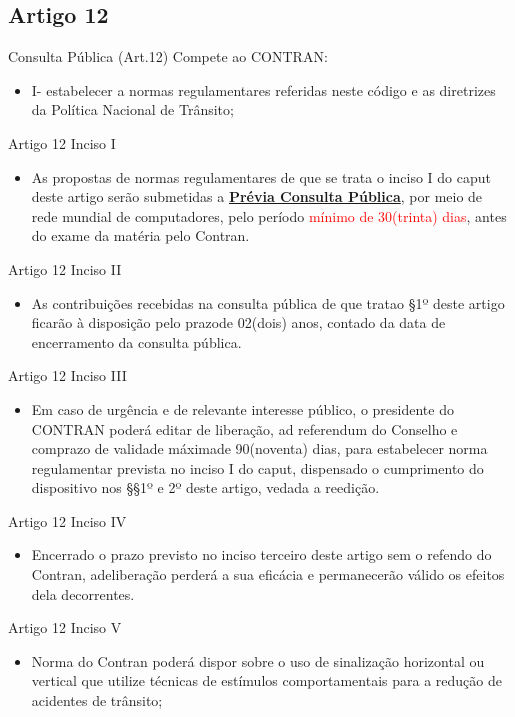 \documentclass{beamer}
\begin{document}
\subsection{Artigo 12}
\begin{frame}{Consulta Pública (Art.12)}
Compete ao CONTRAN:
    \begin{itemize}
        \item \justifying  I- estabelecer a normas regulamentares referidas neste código e as diretrizes da Política Nacional de Trânsito;
    \end{itemize}
\end{frame}
\begin{frame}{Artigo 12 Inciso I}
    \begin{itemize}
        \item \justifying As propostas de normas regulamentares de que se trata o inciso I do caput deste artigo serão submetidas a \textbf{\underline{Prévia Consulta Pública}}, por meio de rede mundial de computadores, pelo período \textcolor{red}{mínimo de 30(trinta) dias}, antes do exame da matéria pelo Contran.
    \end{itemize}
\end{frame}
\begin{frame}{Artigo 12 Inciso II}
    \begin{itemize}
        \item \justifying As contribuições recebidas na consulta pública de que tratao §1º deste artigo ficarão à disposição pelo prazode 02(dois) anos, contado da data de encerramento da consulta pública.
    \end{itemize}
\end{frame}
\begin{frame}{Artigo 12 Inciso III}
    \begin{itemize}
        \item \justifying Em caso de urgência e de relevante interesse público, o presidente do CONTRAN poderá editar de liberação, ad referendum do Conselho e comprazo de validade máximade 90(noventa) dias, para estabelecer norma regulamentar prevista no inciso I do caput, dispensado o cumprimento do dispositivo nos §§1º e 2º deste artigo, vedada a reedição.
    \end{itemize}
\end{frame}
\begin{frame}{Artigo 12 Inciso IV}
    \begin{itemize}
        \item \justifying Encerrado o prazo previsto no inciso terceiro deste artigo sem o refendo do Contran, adeliberação perderá a sua eficácia e permanecerão válido os efeitos dela decorrentes.
    \end{itemize}
\end{frame}
\begin{frame}{Artigo 12 Inciso V}
    \begin{itemize}
        \item \justifying Norma do Contran poderá dispor sobre o uso de sinalização horizontal ou vertical que utilize técnicas de estímulos comportamentais para a redução de acidentes de trânsito;
    \end{itemize}
\end{frame}
\end{document}
